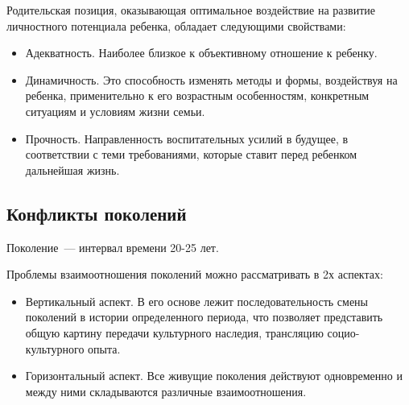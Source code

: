 Родительская позиция, оказывающая оптимальное воздействие на развитие личностного потенциала ребенка, обладает следующими свойствами:
\begin{itemize}
	\item Адекватность. Наиболее близкое к объективному отношение к ребенку.
	\item Динамичность. Это способность изменять методы и формы, воздействуя на ребенка, применительно к его возрастным особенностям, конкретным ситуациям и условиям жизни семьи.
	\item Прочность. Направленность воспитательных усилий в будущее, в соответствии с теми требованиями, которые ставит перед ребенком дальнейшая жизнь.
\end{itemize}

\subsection{Конфликты поколений}
Поколение~--- интервал времени 20-25 лет.

Проблемы взаимоотношения поколений можно рассматривать в 2х аспектах: 
\begin{itemize}
	\item Вертикальный аспект. В его основе лежит последовательность смены поколений в истории определенного периода, что позволяет представить общую картину передачи культурного наследия, трансляцию социо-культурного опыта.
	\item Горизонтальный аспект. Все живущие поколения действуют одновременно и между ними складываются различные взаимоотношения.
\end{itemize}
